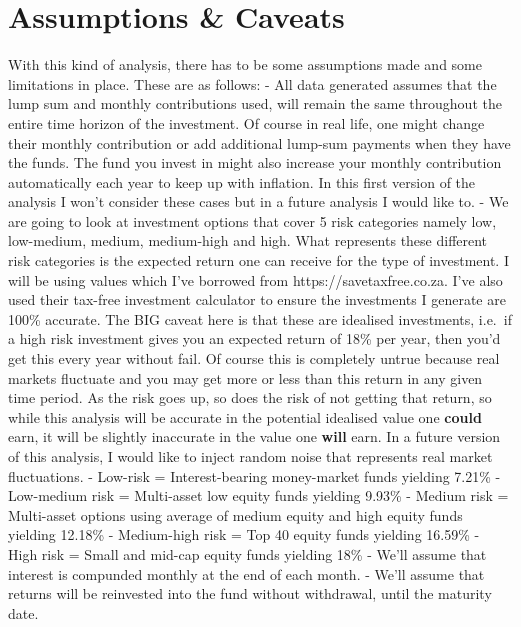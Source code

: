 \documentclass[11pt]{article}
\begin{document}
    \hypertarget{assumptions-caveats}{%
\section{Assumptions \& Caveats}\label{assumptions-caveats}}

    With this kind of analysis, there has to be some assumptions made and
some limitations in place. These are as follows: - All data generated
assumes that the lump sum and monthly contributions used, will remain
the same throughout the entire time horizon of the investment. Of course
in real life, one might change their monthly contribution or add
additional lump-sum payments when they have the funds. The fund you
invest in might also increase your monthly contribution automatically
each year to keep up with inflation. In this first version of the
analysis I won't consider these cases but in a future analysis I would
like to. - We are going to look at investment options that cover 5 risk
categories namely low, low-medium, medium, medium-high and high. What
represents these different risk categories is the expected return one
can receive for the type of investment. I will be using values which
I've borrowed from https://savetaxfree.co.za. I've also used their
tax-free investment calculator to ensure the investments I generate are
100\% accurate. The BIG caveat here is that these are idealised
investments, i.e.~if a high risk investment gives you an expected return
of 18\% per year, then you'd get this every year without fail. Of course
this is completely untrue because real markets fluctuate and you may get
more or less than this return in any given time period. As the risk goes
up, so does the risk of not getting that return, so while this analysis
will be accurate in the potential idealised value one \textbf{could}
earn, it will be slightly inaccurate in the value one \textbf{will}
earn. In a future version of this analysis, I would like to inject
random noise that represents real market fluctuations. - Low-risk =
Interest-bearing money-market funds yielding 7.21\% - Low-medium risk =
Multi-asset low equity funds yielding 9.93\% - Medium risk = Multi-asset
options using average of medium equity and high equity funds yielding
12.18\% - Medium-high risk = Top 40 equity funds yielding 16.59\% - High
risk = Small and mid-cap equity funds yielding 18\% - We'll assume that
interest is compunded monthly at the end of each month. - We'll assume
that returns will be reinvested into the fund without withdrawal, until
the maturity date.
\end{document}
